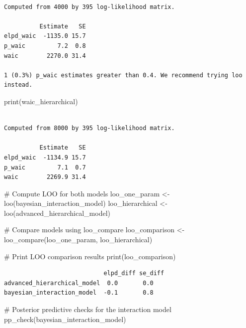 \documentclass[
  10pt,
]{article}
\newenvironment{Shaded}{\begin{snugshade}}{\end{snugshade}}
\newcommand{\CommentTok}[1]{\textcolor[rgb]{0.37,0.37,0.37}{#1}}
\newcommand{\FunctionTok}[1]{\textcolor[rgb]{0.28,0.35,0.67}{#1}}
\newcommand{\NormalTok}[1]{\textcolor[rgb]{0.00,0.23,0.31}{#1}}
\newcommand{\OtherTok}[1]{\textcolor[rgb]{0.00,0.23,0.31}{#1}}
\begin{document}
\begin{verbatim}

Computed from 4000 by 395 log-likelihood matrix.

          Estimate   SE
elpd_waic  -1135.0 15.7
p_waic         7.2  0.8
waic        2270.0 31.4

1 (0.3%) p_waic estimates greater than 0.4. We recommend trying loo instead. 
\end{verbatim}

\begin{Shaded}
\begin{Highlighting}[]
\FunctionTok{print}\NormalTok{(waic\_hierarchical)}
\end{Highlighting}
\end{Shaded}

\begin{verbatim}

Computed from 8000 by 395 log-likelihood matrix.

          Estimate   SE
elpd_waic  -1134.9 15.7
p_waic         7.1  0.7
waic        2269.9 31.4
\end{verbatim}

\begin{Shaded}
\begin{Highlighting}[]
\CommentTok{\# Compute LOO for both models}
\NormalTok{loo\_one\_param }\OtherTok{\textless{}{-}} \FunctionTok{loo}\NormalTok{(bayesian\_interaction\_model)}
\NormalTok{loo\_hierarchical }\OtherTok{\textless{}{-}} \FunctionTok{loo}\NormalTok{(advanced\_hierarchical\_model)}

\CommentTok{\# Compare models using loo\_compare}
\NormalTok{loo\_comparison }\OtherTok{\textless{}{-}} \FunctionTok{loo\_compare}\NormalTok{(loo\_one\_param, loo\_hierarchical)}

\CommentTok{\# Print LOO comparison results}
\FunctionTok{print}\NormalTok{(loo\_comparison)}
\end{Highlighting}
\end{Shaded}

\begin{verbatim}
                            elpd_diff se_diff
advanced_hierarchical_model  0.0       0.0   
bayesian_interaction_model  -0.1       0.8   
\end{verbatim}

\begin{Shaded}
\begin{Highlighting}[]
\CommentTok{\# Posterior predictive checks for the interaction model}
\FunctionTok{pp\_check}\NormalTok{(bayesian\_interaction\_model)}
\end{Highlighting}
\end{Shaded}
\end{document}
